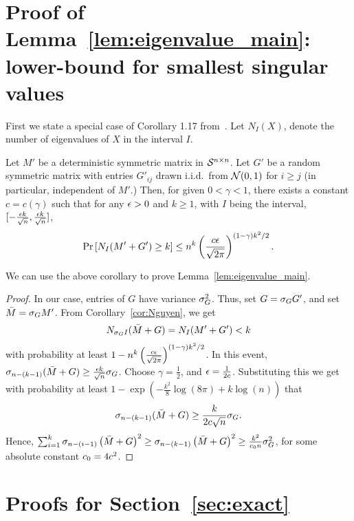 \section{Proof of Lemma~\ref{lem:eigenvalue_main}: lower-bound for smallest singular values}\label{apdx:proofNguyen}

First we state a special case of Corollary 1.17
from~\citep{nguyen2017repulsion}. Let $N_I(X) $, denote the number of
eigenvalues of $X$ in the interval $I$.
\begin{corollary}\label{cor:Nguyen}
  Let $M'$ be a deterministic symmetric matrix in $\mathcal{S}^{n\times n}$. Let $G'$ be a
  random symmetric matrix with entries $G'_{ij}$ drawn i.i.d.\ from
  $\mathcal{N}(0,1)$ for
  $i \geq j$ (in particular, independent of $M'$.) Then, for given $0 < \gamma < 1$, there exists a
  constant $c = c(\gamma)$ such that for any $\epsilon > 0$ and $k \geq 1$,
  with $I$ being the interval,
  $[-\frac{\epsilon k}{\sqrt{n}}, \frac{\epsilon k}{\sqrt{n}}]$,
$$
\operatorname{Pr}\left[{N_I(M'+G') \geq k }\right] \leq n^k \left(\frac{c\epsilon}{\sqrt{2\pi}}\right)^{(1-\gamma)k^2/2}.
$$
\end{corollary}
We can use the above corollary to prove
Lemma~\ref{lem:eigenvalue_main}.
\begin{proof} %
	In our case, entries of $G$ have variance $\sigma_G^2$. Thus, set $G = \sigma_G G'$, and set $\bar M = \sigma_G M'$.
  From Corollary~\ref{cor:Nguyen}, we get
  \begin{align*}
	  N_{\sigma_G I}(\bar M+G) = N_I(M'+G') < k
  \end{align*}
  with probability
  at least $1 - n^k \left(\frac{c\epsilon}{\sqrt{2\pi}}\right)^{(1-\gamma)k^2/2}$. In this event,
  $\sigma_{n-(k-1)}(\bar M+G) \geq \frac{\epsilon k}{\sqrt{n}} \sigma_G$. Choose
  $\gamma =\frac{1}{2}$, and $\epsilon = \frac{1}{2 c}$. Substituting this we get with
  probability at least
  $1 - \exp\left( - \frac{k^2}{8} \log( 8 \pi) + k \log (n)\right)$
  that
$$
\sigma_{n-(k-1)}(\bar M+G) \geq \frac{k}{2c \sqrt{n}}\sigma_G.
$$
Hence,
$\sum_{i=1}^{k} \sigma_{n-(i-1)}\left(\bar M+G\right)^2 \geq
\sigma_{n-(k-1)}\left(\bar M+G\right)^2 \geq \frac{k^2}{c_0 n}
 \sigma_G^2$, for some absolute constant $c_0 = 4c^2$.
\end{proof}


\section{Proofs for Section~\ref{sec:exact}}\label{app:exact}

